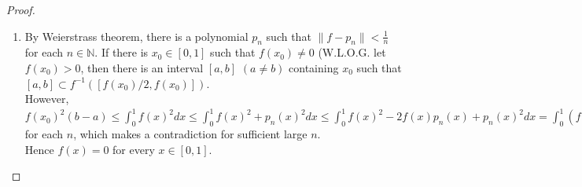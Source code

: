 \documentclass{article}
\begin{document}
\begin{enumerate}[font = \Large\bfseries\itshape\space, leftmargin = 3mm, labelsep = 3mm]
\begin{proof}
\begin{enumerate}[label = (\roman*)]
To show that $q_n$ converges to $0$ uniformly, fix $\epsilon > 0$ and find $N\in\mathbb{N}$ such that $n > N \Rightarrow \|q_n\| \leq \epsilon$.\\
As $\lim_{x\rightarrow0}q_2(x) = 0$, there exists $\delta \in [0,1)$ such that $|x|<\delta \Rightarrow |q_2(x)| < \epsilon$.
Then $q_{n+1}(x) > q_n(x)(1-\delta/10)$ for all $x \in [\delta,1]$.
Since the absolute value of $q_n(x)$ decreases with ratio less then $1-\delta$ and $q_2(x)$ is bounded on $[\delta,1]$, we can find $N$ such that $|q_n(x)| < \epsilon$ for all $x \in [\delta,1]$ and $n \geq N$.
Moreover, $\max_{x\in[0,\delta]}{q_2(x)} < \epsilon$, hence $|q_n(x)| < \epsilon$ for all $n > 1, x \in [0,\delta]$.\\
Now we find $N$ such that $n > N \Rightarrow \|q_n\| \leq \epsilon$, hence $q_n$ uniformly converges to $0$, and $p_n$ converges to $x$.

\item By Weierstrass theorem, there is a polynomial $p_n$ such that $\|f-p_n\| < \frac{1}{n}$ for each $n \in \mathbb{N}$.
If there is $x_0 \in [0,1]$ such that $f(x_0) \neq 0$ (W.L.O.G. let $f(x_0) > 0$, then there is an interval $[a,b]$ $(a\neq b)$ containing $x_0$ such that $[a,b] \subset f^{-1}([f(x_0)/2, f(x_0)])$.\\
However, $f(x_0)^2 (b-a) \leq \int_0^1 f(x)^2 dx \leq \int_0^1 f(x)^2 + p_n(x)^2 dx \leq \int_0^1 f(x)^2 - 2f(x)p_n(x) + p_n(x)^2 dx = \int_0^1 (f(x)-p_n(x))^2 dx \leq \int_0^1 \|f-p_n\| dx \leq \frac{1}{n^2}$ for each $n$, which makes a contradiction for sufficient large $n$.\\
Hence $f(x) = 0$ for every $x \in [0,1]$.
\end{enumerate}
\end{proof}


\end{enumerate}
\end{document}
